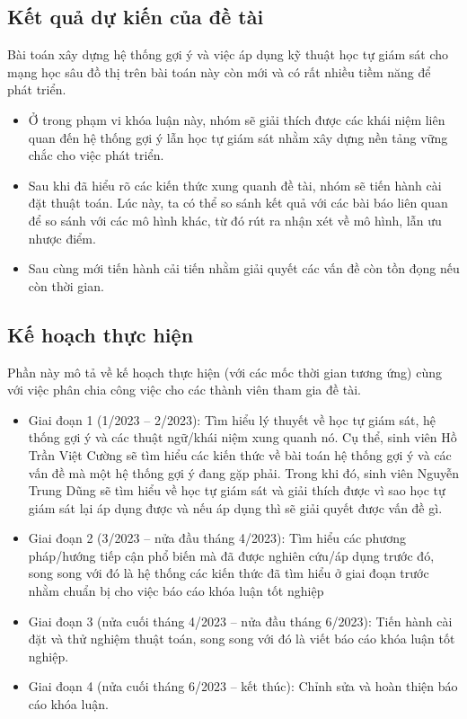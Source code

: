 \documentclass{article}[14pt]
\begin{document}
    \subsection{Kết quả dự kiến của đề tài}
    Bài toán xây dựng hệ thống gợi ý và việc áp dụng kỹ thuật học tự giám sát cho mạng học sâu đồ thị trên bài toán này còn mới và có rất nhiều tiềm năng để phát triển.
    \begin{itemize}
        \item Ở trong phạm vi khóa luận này, nhóm sẽ giải thích được các khái niệm liên quan đến hệ thống gợi ý lẫn học tự giám sát nhằm xây dựng nền tảng vững chắc cho việc phát triển.
        \item Sau khi đã hiểu rõ các kiến thức xung quanh đề tài, nhóm sẽ tiến hành cài đặt thuật toán. Lúc này, ta có thể so sánh kết quả với các bài báo liên quan để so sánh với các mô hình khác, từ đó rút ra nhận xét về mô hình, lẫn ưu nhược điểm. 
        \item Sau cùng mới tiến hành cải tiến nhằm giải quyết các vấn đề còn tồn đọng nếu còn thời gian.

    \end{itemize}
    
    \subsection{Kế hoạch thực hiện}
        
    Phần này mô tả về kế hoạch thực hiện (với các mốc thời gian tương ứng) cùng với việc phân chia công việc cho các thành viên tham gia đề tài.
    \begin{itemize}
        \item Giai đoạn 1 (1/2023 -- 2/2023): Tìm hiểu lý thuyết về học tự giám sát, hệ thống gợi ý và các thuật ngữ/khái niệm xung quanh nó. Cụ thể, sinh viên Hồ Trần Việt Cường sẽ tìm hiểu các kiến thức về bài toán hệ thống gợi ý và các vấn đề mà một hệ thống gợi ý đang gặp phải. Trong khi đó, sinh viên Nguyễn Trung Dũng sẽ tìm hiểu về học tự giám sát và giải thích được vì sao học tự giám sát lại áp dụng được và nếu áp dụng thì sẽ giải quyết được vấn đề gì.
        \item Giai đoạn 2 (3/2023 -- nửa đầu tháng 4/2023): Tìm hiểu các phương pháp/hướng tiếp cận phổ biến mà đã được nghiên cứu/áp dụng trước đó, song song với đó là hệ thống các kiến thức đã tìm hiểu ở giai đoạn trước nhằm chuẩn bị cho việc báo cáo khóa luận tốt nghiệp
        \item Giai đoạn 3 (nửa cuối tháng 4/2023 -- nửa đầu tháng 6/2023): Tiến hành cài đặt và thử nghiệm thuật toán, song song với đó là viết báo cáo khóa luận tốt nghiệp.
        \item Giai đoạn 4 (nửa cuối tháng 6/2023 -- kết thúc): Chỉnh sửa và hoàn thiện báo cáo khóa luận.
    \end{itemize}
\end{document}
